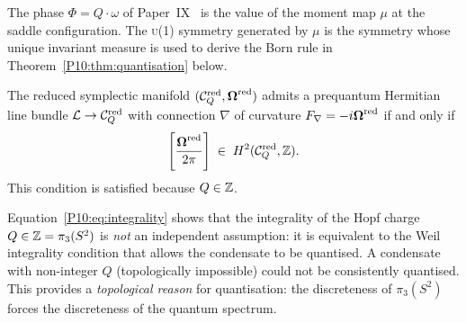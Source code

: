 \begin{remark}
\label{P10:rem:phase_moment_map}
The phase $\Phi = Q\cdot\omega$ of Paper~IX~\cite{Paper9} is the
value of the moment map $\mu$ at the saddle configuration.
The \textsc{u}(1) symmetry generated by $\mu$ is the symmetry whose
unique invariant measure is used to derive the Born rule in
Theorem~\ref{P10:thm:quantisation} below.
\end{remark}

\begin{theorem}
\label{P10:thm:prequantum}
The reduced symplectic manifold $(\mathcal{C}_Q^{\mathrm{red}},\boldsymbol{\Omega}^{\mathrm{red}})$
admits a prequantum Hermitian line bundle
$\mathcal{L}\to\mathcal{C}_Q^{\mathrm{red}}$ with connection $\nabla$ of curvature
$F_\nabla = -i\boldsymbol{\Omega}^{\mathrm{red}}$
if and only if
\begin{equation}
  \left[\frac{\boldsymbol{\Omega}^{\mathrm{red}}}{2\pi}\right]
  \;\in\; H^2(\mathcal{C}_Q^{\mathrm{red}},\mathbb{Z}).
  \label{P10:eq:weil}
\end{equation}
This condition is satisfied because $Q\in\mathbb{Z}$.
\end{theorem}

\begin{remark}
\label{P10:rem:hopf_charge_quantisation}
Equation~\eqref{P10:eq:integrality} shows that the integrality of the
Hopf charge $Q\in\mathbb{Z}=\pi_3(S^2)$ is \emph{not} an independent
assumption: it is equivalent to the Weil integrality condition
that allows the condensate to be quantised.
A condensate with non-integer $Q$ (topologically impossible) could
not be consistently quantised.
This provides a \emph{topological reason} for quantisation:
the discreteness of $\pi_3(S^2)$ forces the discreteness of the
quantum spectrum.
\end{remark}

